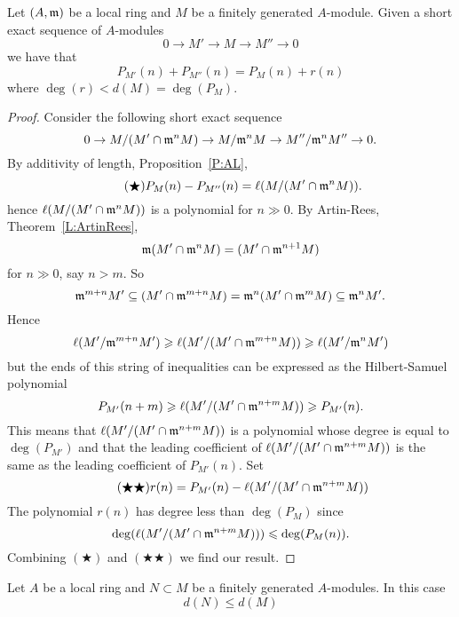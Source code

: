 \documentclass{ximera}
\begin{document}
\begin{proposition}\label{P:AddHS}
  Let $(A,\mathfrak{m})$ be a local ring and $M$ be a finitely generated
  $A$-module. Given a short exact sequence of $A$-modules
  \[
  0\to M' \to M\to M'' \to 0
  \]
  we have that
  \[
  P_{M'}(n) + P_{M''}(n) = P_M(n) +r(n)
  \]
  where $\deg(r)< d(M) = \deg(P_M)$.
  \begin{proof}
    Consider the following short exact sequence
    \[
    0 \to M/(M'\cap \mathfrak{m}^n M) \to M/\mathfrak{m}^n M \to M''/\mathfrak{m}^n M'' \to 0.
    \]
    By additivity of length, Proposition~\ref{P:AL},
    \[\tag{$\bigstar$}
    P_M(n) - P_{M''}(n)  = \ell(M/(M'\cap \mathfrak{m}^n M)).
    \]
    hence $\ell(M/(M'\cap \mathfrak{m}^n M))$ is a polynomial for $n\gg 0$. By
    Artin-Rees, Theorem~\ref{L:ArtinRees}, 
    \[
    \mathfrak{m} (M'\cap \mathfrak{m}^n M) = (M'\cap \mathfrak{m}^{n+1} M)
    \]
    for $n\gg 0$, say $n>m$.  So
    \[
    \mathfrak{m}^{m+n} M' \subseteq (M'\cap \mathfrak{m}^{m+n}M)  = \mathfrak{m}^n (M'\cap\mathfrak{m}^m M)\subseteq \mathfrak{m}^n M'.
    \]
    Hence
    \[
    \ell(M'/\mathfrak{m}^{m+n}M')\geqslant \ell(M'/(M'\cap \mathfrak{m}^{m+n}M))\geqslant \ell(M'/\mathfrak{m}^n M')
    \]
    but the ends of this string of inequalities can be expressed as
    the Hilbert-Samuel polynomial
    \[
    P_{M'}(n+m) \geqslant \ell(M'/(M'\cap \mathfrak{m}^{n+m}M)) \geqslant P_{M'}(n).
    \]
    This means that $\ell(M'/(M'\cap \mathfrak{m}^{n+m}M))$ is a polynomial whose
    degree is equal to $\deg(P_{M'})$ and that the leading coefficient
    of $\ell(M'/(M'\cap \mathfrak{m}^{n+m}M))$ is the same as the leading
    coefficient of $P_{M'}(n)$. Set
    \[\tag{$\bigstar\bigstar$}
    r(n) = P_{M'}(n) -\ell(M'/(M'\cap \mathfrak{m}^{n+m}M))
    \]
    The polynomial $r(n)$ has degree less than $\deg(P_{M})$ since
    \[
    \deg(\ell(M'/(M'\cap \mathfrak{m}^{n+m}M)))\leqslant \deg(P_M(n)).
    \]
    Combining $(\bigstar)$ and $(\bigstar\bigstar)$ we find our
    result.
  \end{proof}
\end{proposition}


\begin{corollary}\label{C:sub}
  Let $A$ be a local ring and $N\subset M$ be a finitely generated
  $A$-modules. In this case
  \[
  d(N) \le d(M)
  \]
\end{corollary}
\end{document}
